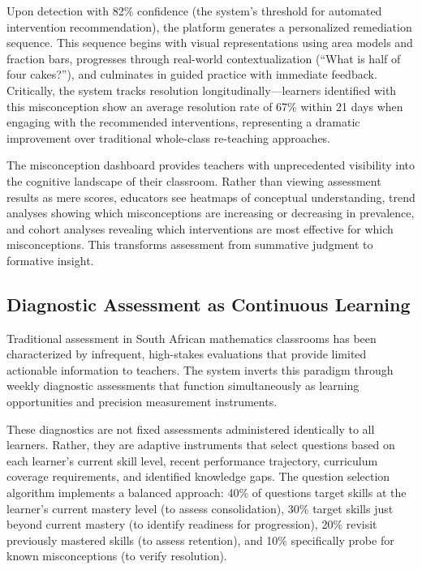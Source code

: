\documentclass[12pt,a4paper]{article}
\begin{document}
Upon detection with 82\% confidence (the system's threshold for automated intervention recommendation), the platform generates a personalized remediation sequence. This sequence begins with visual representations using area models and fraction bars, progresses through real-world contextualization (``What is half of four cakes?''), and culminates in guided practice with immediate feedback. Critically, the system tracks resolution longitudinally---learners identified with this misconception show an average resolution rate of 67\% within 21 days when engaging with the recommended interventions, representing a dramatic improvement over traditional whole-class re-teaching approaches.

The misconception dashboard provides teachers with unprecedented visibility into the cognitive landscape of their classroom. Rather than viewing assessment results as mere scores, educators see heatmaps of conceptual understanding, trend analyses showing which misconceptions are increasing or decreasing in prevalence, and cohort analyses revealing which interventions are most effective for which misconceptions. This transforms assessment from summative judgment to formative insight.

\subsection{Diagnostic Assessment as Continuous Learning}

Traditional assessment in South African mathematics classrooms has been characterized by infrequent, high-stakes evaluations that provide limited actionable information to teachers. The system inverts this paradigm through weekly diagnostic assessments that function simultaneously as learning opportunities and precision measurement instruments.

These diagnostics are not fixed assessments administered identically to all learners. Rather, they are adaptive instruments that select questions based on each learner's current skill level, recent performance trajectory, curriculum coverage requirements, and identified knowledge gaps. The question selection algorithm implements a balanced approach: 40\% of questions target skills at the learner's current mastery level (to assess consolidation), 30\% target skills just beyond current mastery (to identify readiness for progression), 20\% revisit previously mastered skills (to assess retention), and 10\% specifically probe for known misconceptions (to verify resolution).
\end{document}
